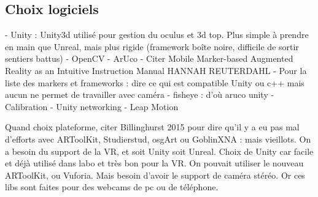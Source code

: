 \subsection{Choix logiciels}
- Unity : Unity3d utilisé pour gestion du oculus et 3d top. Plus simple à prendre en main que Unreal, mais plus rigide (framework boîte noire, difficile de sortir sentiers battus)
- OpenCV
  - ArUco
    - Citer Mobile Marker-based Augmented Reality as an Intuitive Instruction Manual HANNAH REUTERDAHL
    - Pour la liste des markers et frameworks : dire ce qui est compatible Unity ou c++ mais aucun ne permet de travailler avec caméra - fisheye : d'où aruco unity
  - Calibration
- Unity networking
- Leap Motion

Quand choix plateforme, citer Billinghurst 2015 pour dire qu'il y a eu pas mal d'efforts avec ARToolKit, Studierstud, osgArt ou GoblinXNA : mais vieillots. On a besoin du support de la VR, et soit Unity soit Unreal. Choix de Unity car facile et déjà utilisé dans labo et très bon pour la VR.
On pouvait utiliser le nouveau ARToolKit, ou Vuforia. Mais besoin d'avoir le support de caméra stéréo. Or ces libs sont faites pour des webcams de pc ou de téléphone.


